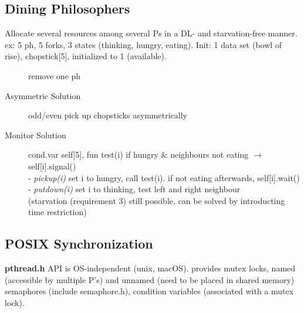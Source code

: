 \subsection*{Dining Philosophers}
Allocate several resources among several Ps in a DL- and starvation-free manner. ex: 5 ph, 5 forks, 3 states (thinking, hungry, eating). Init: 1 data set (bowl of rise), chopstick[5], initialized to 1 (available).
\begin{description}
    \item[]remove one ph %
    \item[Asymmetric Solution] odd/even pick up chopsticks asymmetrically
    \item[Monitor Solution]cond.var self[5], fun test(i) if hungry \& neighbours not eating $\rightarrow$ self[i].signal() \\
        - \textit{pickup(i)} set i to hungry, call test(i). if not eating afterwards, self[i].wait() \\
        - \textit{putdown(i)} set i to thinking, test left and right neighbour \\
        (starvation (requirement 3) still possible, can be solved by introducting time restriction)
\end{description}
\subsection*{POSIX Synchronization}
    \textbf{pthread.h} API is OS-independent (unix, macOS). provides mutex locks, named (accessible by multiple P's) and unnamed (need to be placed in shared memory) semaphores (include semaphore.h), condition variables (associated with a mutex lock).
